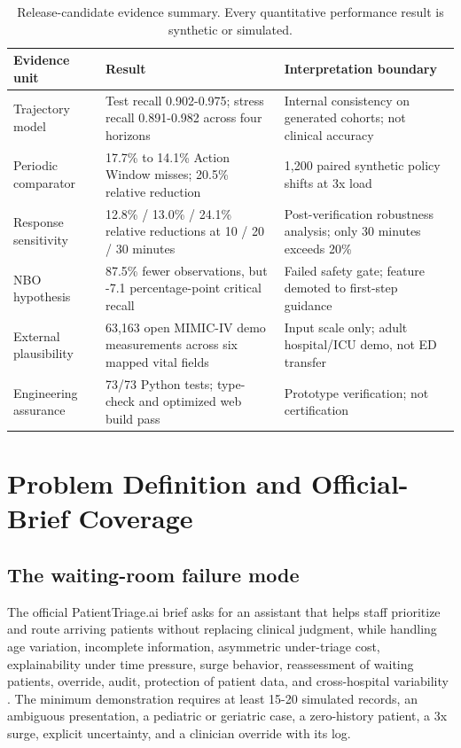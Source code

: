 \documentclass[11pt,a4paper]{article}
\begin{document}
\begin{table}[H]
\centering
\caption{Release-candidate evidence summary. Every quantitative performance result is synthetic or simulated.}
\begin{tabularx}{\textwidth}{@{}L{42mm}L{43mm}Y@{}}
\toprule
Evidence unit & Result & Interpretation boundary \\
\midrule
Trajectory model & Test recall 0.902-0.975; stress recall 0.891-0.982 across four horizons & Internal consistency on generated cohorts; not clinical accuracy \\
Periodic comparator & 17.7\% to 14.1\% Action Window misses; 20.5\% relative reduction & 1,200 paired synthetic policy shifts at 3x load \\
Response sensitivity & 12.8\% / 13.0\% / 24.1\% relative reductions at 10 / 20 / 30 minutes & Post-verification robustness analysis; only 30 minutes exceeds 20\% \\
NBO hypothesis & 87.5\% fewer observations, but -7.1 percentage-point critical recall & Failed safety gate; feature demoted to first-step guidance \\
External plausibility & 63,163 open MIMIC-IV demo measurements across six mapped vital fields & Input scale only; adult hospital/ICU demo, not ED transfer \\
Engineering assurance & 73/73 Python tests; type-check and optimized web build pass & Prototype verification; not certification \\
\bottomrule
\end{tabularx}
\end{table}

\section{Problem Definition and Official-Brief Coverage}

\subsection{The waiting-room failure mode}

The official PatientTriage.ai brief asks for an assistant that helps staff prioritize and route arriving patients without replacing clinical judgment, while handling age variation, incomplete information, asymmetric under-triage cost, explainability under time pressure, surge behavior, reassessment of waiting patients, override, audit, protection of patient data, and cross-hospital variability \cite{accenturebrief}. The minimum demonstration requires at least 15-20 simulated records, an ambiguous presentation, a pediatric or geriatric case, a zero-history patient, a 3x surge, explicit uncertainty, and a clinician override with its log.
\end{document}
